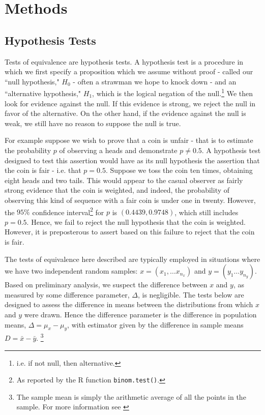 
\chapter{Methods} 

 \section{Hypothesis Tests}
 \label{Hypothesis Test}
 
 Tests of equivalence are hypothesis tests. A hypothesis test is a procedure in which we first specify a proposition which we assume without proof - called our ``null hypothesis," $H_0$ - often a strawman we hope to knock down - and an ``alternative hypothesis," $H_1$, which is the logical negation of the null.\footnote{i.e. if not null, then alternative.} We then look for evidence against the null. If this evidence is strong, we reject the null in favor of the alternative. On the other hand, if the evidence against the null is weak, we still have no reason to suppose the null is true. 
 
 For example suppose we wish to prove that a coin is unfair - that is to estimate the probability $p$ of observing a heads and demonstrate $ p \neq 0.5$. A hypothesis test designed to test this assertion would have as its null hypothesis the assertion that the coin is fair - i.e. that $p = 0.5 $. Suppose we toss the coin ten times, obtaining eight heads and two tails. This would appear to the casual observer as fairly strong evidence that the coin is weighted, and indeed, the probability of observing this kind of sequence with a fair coin is under one in twenty. However, the $95\%$ confidence interval\footnote{As reported by the R function \texttt{binom.test()}.} for $p$ is  $(0.4439, 0.9748 )$, which still includes $p = 0.5$. Hence, we fail to reject the null hypothesis that the coin is weighted. However, it is preposterous to assert based on this failure to reject that the coin is fair. 
 
The tests of equivalence here described are typically employed in situations where we have two independent random samples: $x = (x_1, \dots x_{n_x})$ and $y = (y_1 \dots y_{n_y})$. Based on preliminary analysis, we suspect the difference between $x$ and $y$, as measured by some difference parameter, $\Delta$, is negligible. The tests below are designed to assess the difference in means between the distributions from which $x$ and $y$ were drawn. Hence the difference parameter is the difference in population means, $\Delta = \mu_x - \mu_y$, with estimator given by the difference in sample means $D = \bar{x} - \bar{y}$. \footnote{The sample mean is simply the arithmetic average of all the points in the sample. For more information see \cite{Intro} }

